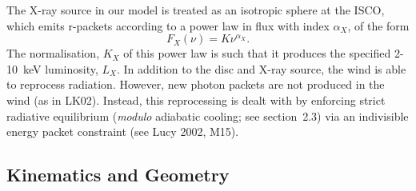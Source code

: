 \documentclass[preprint, a4paper, 11pt]{aastex}
\begin{document}
The X-ray source in our model is treated as an isotropic sphere at the ISCO,
which emits r-packets according to a power law in flux with index $\alpha_X$, of the form
\begin{equation}
F_X (\nu) = K \nu^{\alpha_X}.
\end{equation}
The normalisation, $K_X$ of this power law is such that it 
produces the specified 2-10~keV luminosity, $L_X$.
In addition to the disc and X-ray source, 
the wind is able to reprocess radiation. However, new 
photon packets are not produced in the wind (as in LK02). 
Instead, this reprocessing is dealt with by enforcing strict
radiative equilibrium ({\em modulo} adiabatic cooling; see section~2.3)
via an indivisible energy packet
constraint (see Lucy 2002, M15).









\subsection{Kinematics and Geometry}
\end{document}
